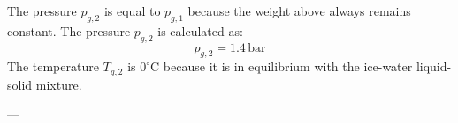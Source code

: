 The pressure \( p_{g,2} \) is equal to \( p_{g,1} \) because the weight above always remains constant.  
The pressure \( p_{g,2} \) is calculated as:  
\[
p_{g,2} = 1.4 \, \text{bar}
\]  
The temperature \( T_{g,2} \) is \( 0^\circ\text{C} \) because it is in equilibrium with the ice-water liquid-solid mixture.  

---
